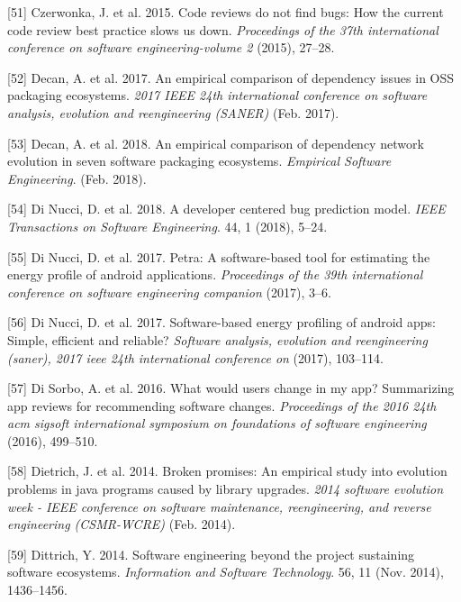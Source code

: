 \documentclass[]{book}
\begin{document}
\hypertarget{ref-czerwonka2015code}{}
{[}51{]} Czerwonka, J. et al. 2015. Code reviews do not find bugs: How
the current code review best practice slows us down. \emph{Proceedings
of the 37th international conference on software engineering-volume 2}
(2015), 27--28.

\hypertarget{ref-Decan2017}{}
{[}52{]} Decan, A. et al. 2017. An empirical comparison of dependency
issues in OSS packaging ecosystems. \emph{2017 IEEE 24th international
conference on software analysis, evolution and reengineering (SANER)}
(Feb. 2017).

\hypertarget{ref-Decan2018}{}
{[}53{]} Decan, A. et al. 2018. An empirical comparison of dependency
network evolution in seven software packaging ecosystems.
\emph{Empirical Software Engineering}. (Feb. 2018).

\hypertarget{ref-DiNucci2018}{}
{[}54{]} Di Nucci, D. et al. 2018. A developer centered bug prediction
model. \emph{IEEE Transactions on Software Engineering}. 44, 1 (2018),
5--24.

\hypertarget{ref-NPPPZL2017B}{}
{[}55{]} Di Nucci, D. et al. 2017. Petra: A software-based tool for
estimating the energy profile of android applications. \emph{Proceedings
of the 39th international conference on software engineering companion}
(2017), 3--6.

\hypertarget{ref-NPPPZL2017}{}
{[}56{]} Di Nucci, D. et al. 2017. Software-based energy profiling of
android apps: Simple, efficient and reliable? \emph{Software analysis,
evolution and reengineering (saner), 2017 ieee 24th international
conference on} (2017), 103--114.

\hypertarget{ref-di2016would}{}
{[}57{]} Di Sorbo, A. et al. 2016. What would users change in my app?
Summarizing app reviews for recommending software changes.
\emph{Proceedings of the 2016 24th acm sigsoft international symposium
on foundations of software engineering} (2016), 499--510.

\hypertarget{ref-Dietrich2014}{}
{[}58{]} Dietrich, J. et al. 2014. Broken promises: An empirical study
into evolution problems in java programs caused by library upgrades.
\emph{2014 software evolution week - IEEE conference on software
maintenance, reengineering, and reverse engineering (CSMR-WCRE)} (Feb.
2014).

\hypertarget{ref-Dittrich2014}{}
{[}59{]} Dittrich, Y. 2014. Software engineering beyond the project
sustaining software ecosystems. \emph{Information and Software
Technology}. 56, 11 (Nov. 2014), 1436--1456.
\end{document}
